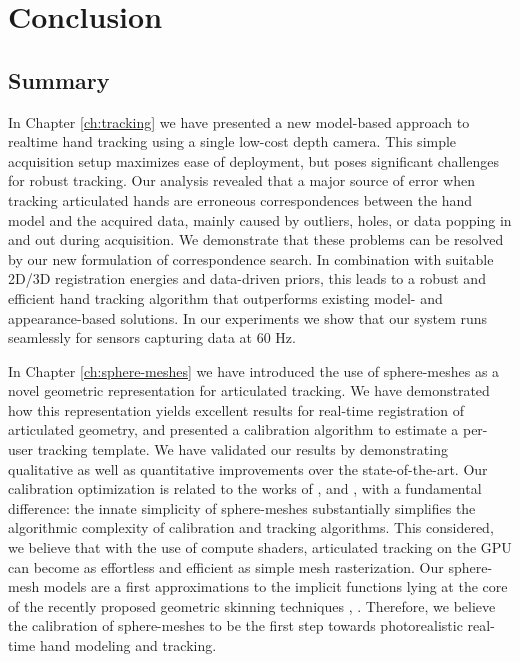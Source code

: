 \chapter{Conclusion}

\section{Summary}

In Chapter \ref{ch:tracking} we have presented a new model-based approach to realtime hand tracking using a single low-cost depth camera. This simple acquisition setup maximizes ease of deployment, but poses significant challenges for robust tracking. 
Our analysis revealed that a major source of error when tracking articulated hands are erroneous correspondences between the hand model and the acquired data, mainly caused by outliers, holes, or data popping in and out during acquisition. 
We demonstrate that these problems can be resolved by our new formulation of correspondence search. In combination with suitable 2D/3D registration energies and data-driven priors, this leads to a robust and efficient hand tracking algorithm that outperforms existing model- and appearance-based solutions. In our experiments we show that our system runs seamlessly for sensors capturing data at 60 Hz. 

In Chapter \ref{ch:sphere-meshes} we have introduced the use of sphere-meshes as a novel geometric representation for articulated tracking. We have demonstrated how this representation yields excellent results for real-time registration of articulated geometry, and presented a calibration algorithm to estimate a per-user tracking template. We have validated our results by demonstrating qualitative as well as quantitative improvements over the state-of-the-art. Our calibration optimization is related to the works of \cite{taylor2014user},  \cite{khamis15learning} and  \cite{joseph2016fits}, with a fundamental difference: the innate simplicity of sphere-meshes substantially simplifies the algorithmic complexity of calibration and tracking algorithms. This considered, we believe that with the use of compute shaders, articulated tracking on the GPU can become as effortless and efficient as simple mesh rasterization. 
Our sphere-mesh models are a first approximations to the implicit functions lying at the core of the recently proposed geometric skinning techniques \cite{vaillant2013implicit},  \cite{vaillant2014robust}. Therefore, we believe the calibration of sphere-meshes to be the first step towards photorealistic real-time hand modeling and tracking.

